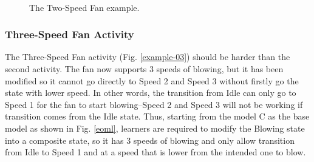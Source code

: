 \documentclass[conference]{IEEEtran}
\begin{document}
\begin{figure}[th]
    \centering
    \\
	\caption{The Two-Speed Fan example.}
    \label{example-02}
\end{figure}

\subsubsection{Three-Speed Fan Activity}
The Three-Speed Fan activity (Fig. \ref{example-03}) should be harder than the second activity. The fan now supports 3 speeds of blowing, but it has been modified so it cannot go directly to Speed 2 and Speed 3 without firstly go the state with lower speed. In other words, the transition from Idle can only go to Speed 1 for the fan to start blowing--Speed 2 and Speed 3 will not be working if transition comes from the Idle state. Thus, starting from the model C as the base model as shown in Fig. \ref{eoml}, learners are required to modify the Blowing state into a composite state, so it has 3 speeds of blowing and only allow transition from Idle to Speed 1 and at a speed that is lower from the intended one to blow.
\end{document}
